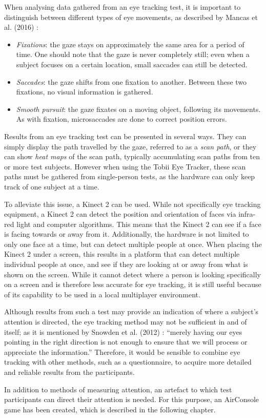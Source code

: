 When analysing data gathered from an eye tracking test, it is important to distinguish between different types of eye movements, as described by Mancas et al. (2016) \cite{Mancas2016}:

\begin{itemize}
\item \textit{Fixations}: the gaze stays on approximately the same area for a period of time. One should note that the gaze is never completely still; even when a subject focuses on a certain location, small saccades can still be detected.
\item \textit{Saccades}: the gaze shifts from one fixation to another. Between these two fixations, no visual information is gathered.
\item \textit{Smooth pursuit}: the gaze fixates on a moving object, following its movements. As with fixation, microsaccades are done to correct position errors.
\end{itemize}

Results from an eye tracking test can be presented in several ways. They can simply display the path travelled by the gaze, referred to as a \textit{scan path}, or they can show \textit{heat maps} of the scan path, typically accumulating scan paths from ten or more test subjects. However when using the Tobii Eye Tracker, these scan paths must be gathered from single-person tests, as the hardware can only keep track of one subject at a time.

To alleviate this issue, a Kinect 2 can be used. While not specifically eye tracking equipment, a Kinect 2 can detect the position and orientation of faces via infra-red light and computer algorithms. This means that the Kinect 2 can see if a face is facing towards or away from it. Additionally, the hardware is not limited to only one face at a time, but can detect multiple people at once. When placing the Kinect 2 under a screen, this results in a platform that can detect multiple individual people at once, and see if they are looking at or away from what is shown on the screen. While it cannot detect where a person is looking specifically on a screen and is therefore less accurate for eye tracking, it is still useful because of its capability to be used in a local multiplayer environment.

Although results from such a test may provide an indication of where a subject’s attention is directed, the eye tracking method may not be sufficient in and of itself; as it is mentioned by Snowden et al. (2012) \cite{snowden2012basic}: “merely having our eyes pointing in the right direction is not enough to ensure that we will process or appreciate the information.” Therefore, it would be sensible to combine eye tracking with other methods, such as a questionnaire, to acquire more detailed and reliable results from the participants.

In addition to methods of measuring attention, an artefact to which test participants can direct their attention is needed. For this purpose, an AirConsole game has been created, which is described in the following chapter.
